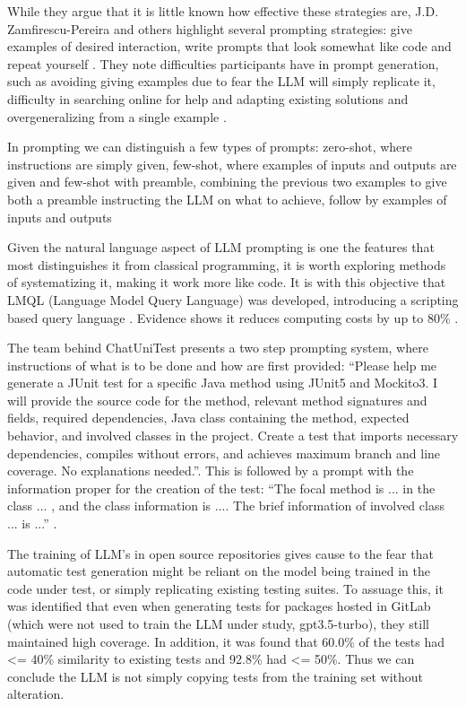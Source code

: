 While they argue that it is little known how effective these strategies are, J.D. Zamfirescu-Pereira and others highlight several prompting strategies: give examples of desired interaction, write prompts that look somewhat like code and repeat yourself \citep{kn:johnny}. They note difficulties participants have in prompt generation, such as avoiding giving examples due to fear the LLM will simply replicate it, difficulty in searching online for help and adapting existing solutions and overgeneralizing from a single example \citep{kn:johnny}.

In prompting we can distinguish a few types of prompts: zero-shot, where instructions are simply given, few-shot, where examples of inputs and outputs are given and few-shot with preamble, combining the previous two examples to give both a preamble instructing the LLM on what to achieve, follow by examples of inputs and outputs \citep{kn:promptprofiannaca}

Given the natural language aspect of LLM prompting is one the features that most distinguishes it from classical programming, it is worth exploring methods of systematizing it, making it work more like code. It is with this objective that LMQL (Language Model Query Language) was developed, introducing a scripting based query language \citep{kn:lmql}. Evidence shows it reduces computing costs by up to 80\% \citep{kn:lmql}.

The team behind ChatUniTest presents a two step prompting system, where instructions of what is to be done and how are first provided: ``Please help me generate a JUnit test for a specific Java method using JUnit5 and Mockito3. I will provide the source code for the method, relevant method signatures and fields, required dependencies, Java class containing the method, expected behavior, and involved classes in the project. Create a test that imports necessary dependencies, compiles without errors, and achieves maximum branch and line coverage. No explanations needed.''. This is followed by a prompt with the information proper for the creation of the test: ``The focal method is ... in the class ... , and the class information is .... The brief information of involved class ... is ...'' \citep{kn:chatunitest}.


The training of LLM's in open source repositories gives cause to the fear that automatic test generation might be reliant on the model being trained in the code under test, or simply replicating existing testing suites. To assuage this, it was identified that even when generating tests for packages hosted in GitLab (which were not used to train the LLM under study, gpt3.5-turbo), they still maintained high coverage. In addition, it was found that 60.0\% of the tests had <= 40\% similarity to existing tests and 92.8\% had <= 50\%. Thus we can conclude the LLM is not simply copying tests from the training set without alteration\citep{kn:max}.


